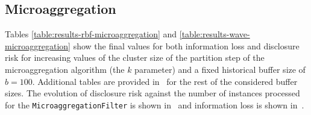 \clearpage

\subsection{Microaggregation}
\label{Benchmarking:Results:MicroAgg}

Tables \ref{table:results-rbf-microaggregation} and \ref{table:results-wave-microaggregation} show the final values for both information loss and disclosure risk for increasing values of the cluster size of the partition step of the microaggregation algorithm (the $k$ parameter) and a fixed historical buffer size of $b = 100$. Additional tables are provided in~ for the rest of the considered buffer sizes. The evolution of disclosure risk against the number of instances processed for the \texttt{MicroaggregationFilter} is shown in~ and information loss is shown in~.

